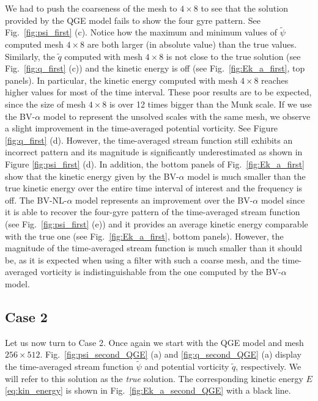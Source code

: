 \documentclass[11pt,a4paper]{article}
\begin{document}
We had to push the coarseness of the mesh to $4 \times 8$ to see that the solution provided by the QGE model 
fails to show the four gyre pattern. See Fig.~\ref{fig:psi_first} (c). Notice how the maximum and minimum values of
$\widetilde{\psi}$ computed mesh $4 \times 8$ are both larger (in absolute value) than the true values. 
Similarly, the $\widetilde{q}$ computed with mesh $4 \times 8$ is not close to the true solution (see Fig.~\ref{fig:q_first} (c))
and the kinetic energy is off (see Fig.~\ref{fig:Ek_a_first}, top panels). In particular, the kinetic energy computed with mesh 
$4 \times 8$ reaches higher values for most of the time interval. 
These poor results are to be expected, since the size of mesh $4 \times 8$ is over 12 times bigger than the Munk scale. 
If we use the BV-$\alpha$ model to represent the unsolved scales with the same mesh, we observe
a slight improvement in the time-averaged potential vorticity. See Figure \ref{fig:q_first} (d). However, 
the time-averaged stream function still exhibits an incorrect pattern and its magnitude is significantly underestimated 
as shown in Figure \ref{fig:psi_first} (d). In addition, the bottom panels of Fig.~\ref{fig:Ek_a_first} show that 
the kinetic energy given by the BV-$\alpha$ model is much smaller than the true kinetic energy
over the entire time interval of interest and the frequency is off.
The BV-NL-$\alpha$ model represents an improvement over the BV-$\alpha$ model
since it is able to recover the four-gyre pattern of the time-averaged stream function (see Fig.~\ref{fig:psi_first} (e))
and it provides an average kinetic energy comparable with the true one (see Fig.~\ref{fig:Ek_a_first}, bottom panels). 
However, the magnitude of the time-averaged stream function is much smaller than it should be, as it is expected
when using a filter with such a coarse mesh, and the time-averaged vorticity is indistinguishable from the
one computed by the BV-$\alpha$ model. 


\subsection{Case 2}

Let us now turn to Case 2.
Once again we start with the QGE model and mesh $256 \times 512$. 
Fig.~\ref{fig:psi_second_QGE} (a) and \ref{fig:q_second_QGE} (a)
display the time-averaged stream function $\widetilde{\psi}$ and potential vorticity $\widetilde{q}$, 
respectively. We will refer to this solution as the \emph{true} solution.
The corresponding  kinetic energy $E$ \eqref{eq:kin_energy} is shown in Fig.~\ref{fig:Ek_a_second_QGE} 
with a black line. 
\end{document}
